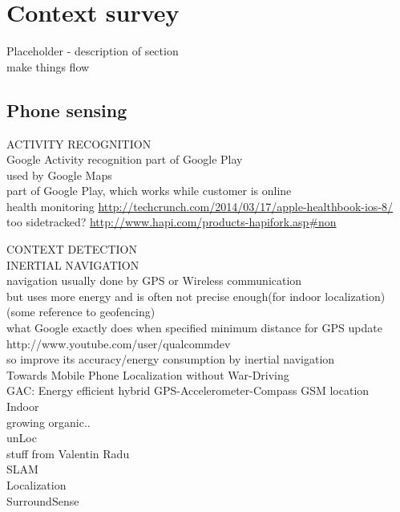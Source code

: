 \section{Context survey}
\label{s:contextsurvey}
Placeholder - description of section\\ make things flow

\subsection{Phone sensing}
ACTIVITY RECOGNITION\\
	Google Activity recognition part of Google Play \cite{android:activityrecognition}\\
		used by Google Maps\\
		part of Google Play, which works while customer is online\\
		
	health monitoring
		\url{http://techcrunch.com/2014/03/17/apple-healthbook-ios-8/}
		too sidetracked?
			\url{http://www.hapi.com/products-hapifork.asp#non}
		

CONTEXT DETECTION\\
	INERTIAL NAVIGATION\\
		navigation usually done by GPS or Wireless communication\\
		but uses more energy and is often not precise enough(for indoor localization)\\
			(some reference to geofencing)\\
			 what Google exactly does when specified minimum distance for GPS update\\
			http://www.youtube.com/user/qualcommdev\\
		so improve its accuracy/energy consumption by inertial navigation\\
		Towards Mobile Phone Localization without War-Driving\cite{constandache:localization}\\
		GAC: Energy efficient hybrid GPS-Accelerometer-Compass GSM location\\
		Indoor\\
			growing organic..\\
			unLoc\\
			stuff from Valentin Radu\\
	
	SLAM\\

	Localization \\
		SurroundSense \cite{azizyan:surroundsense}\\

